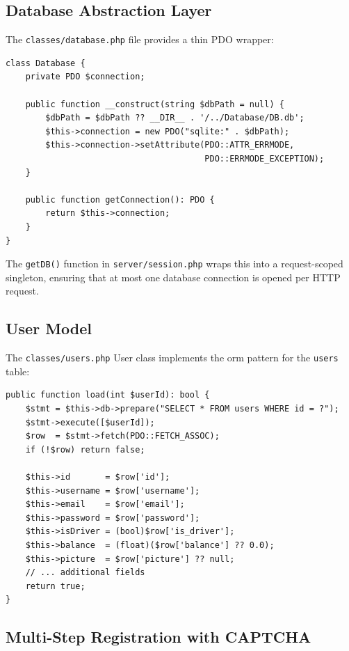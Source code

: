 \documentclass[12pt,a4paper,openright]{report}
\begin{document}
\subsection{Database Abstraction Layer}

The \texttt{classes/database.php} file provides a thin PDO wrapper:

\begin{lstlisting}[style=phpstyle, caption={Database Class (Singleton PDO Wrapper)}]
class Database {
    private PDO $connection;

    public function __construct(string $dbPath = null) {
        $dbPath = $dbPath ?? __DIR__ . '/../Database/DB.db';
        $this->connection = new PDO("sqlite:" . $dbPath);
        $this->connection->setAttribute(PDO::ATTR_ERRMODE,
                                        PDO::ERRMODE_EXCEPTION);
    }

    public function getConnection(): PDO {
        return $this->connection;
    }
}
\end{lstlisting}

\noindent The \texttt{getDB()} function in \texttt{server/session.php} wraps this into a request-scoped singleton, ensuring that at most one database connection is opened per HTTP request.

\subsection{User Model}

The \texttt{classes/users.php} User class implements the \gls{orm} pattern for the \texttt{users} table:

\begin{lstlisting}[style=phpstyle, caption={User::load() --- Hydrating a User from the Database}]
public function load(int $userId): bool {
    $stmt = $this->db->prepare("SELECT * FROM users WHERE id = ?");
    $stmt->execute([$userId]);
    $row  = $stmt->fetch(PDO::FETCH_ASSOC);
    if (!$row) return false;

    $this->id       = $row['id'];
    $this->username = $row['username'];
    $this->email    = $row['email'];
    $this->password = $row['password'];
    $this->isDriver = (bool)$row['is_driver'];
    $this->balance  = (float)($row['balance'] ?? 0.0);
    $this->picture  = $row['picture'] ?? null;
    // ... additional fields
    return true;
}
\end{lstlisting}

\subsection{Multi-Step Registration with CAPTCHA}
\end{document}
